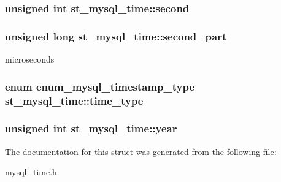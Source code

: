 \subsubsection[{second}]{\setlength{\rightskip}{0pt plus 5cm}unsigned int st\+\_\+mysql\+\_\+time\+::second}\label{structst__mysql__time_a01759e2debb2c19a1116f2e2428c5a28}
\hypertarget{structst__mysql__time_a856f752bf9266990880feae2673f8eba}{}
\subsubsection[{second\+\_\+part}]{\setlength{\rightskip}{0pt plus 5cm}unsigned long st\+\_\+mysql\+\_\+time\+::second\+\_\+part}\label{structst__mysql__time_a856f752bf9266990880feae2673f8eba}
microseconds \hypertarget{structst__mysql__time_a129453ae2fee84375c0b0ab17962325b}{}
\subsubsection[{time\+\_\+type}]{\setlength{\rightskip}{0pt plus 5cm}enum {\bf enum\+\_\+mysql\+\_\+timestamp\+\_\+type} st\+\_\+mysql\+\_\+time\+::time\+\_\+type}\label{structst__mysql__time_a129453ae2fee84375c0b0ab17962325b}
\hypertarget{structst__mysql__time_a2fb9953d417685aaf398eec5d437374a}{}
\subsubsection[{year}]{\setlength{\rightskip}{0pt plus 5cm}unsigned int st\+\_\+mysql\+\_\+time\+::year}\label{structst__mysql__time_a2fb9953d417685aaf398eec5d437374a}


The documentation for this struct was generated from the following file\+:\begin{DoxyCompactItemize}
\item 
\hyperlink{mysql__time_8h}{mysql\+\_\+time.\+h}\end{DoxyCompactItemize}
